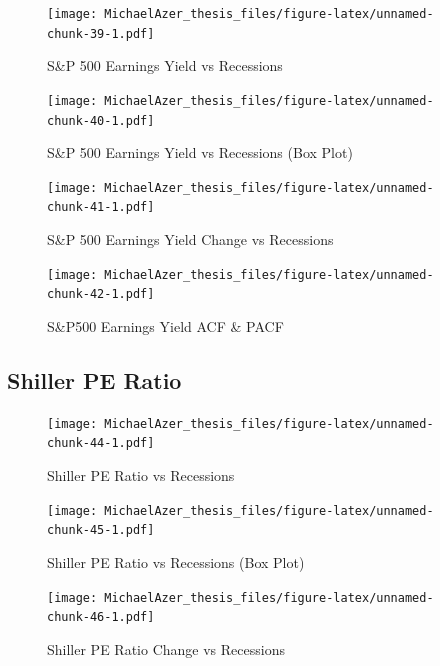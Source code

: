 \documentclass[]{book}
\begin{document}
\begin{figure}
\centering
\texttt{[image: MichaelAzer\_thesis\_files/figure-latex/unnamed-chunk-39-1.pdf]}
\caption{\label{fig:unnamed-chunk-39}\label{fig:figs}S\&P 500 Earnings Yield vs Recessions}
\end{figure}

\begin{figure}
\centering
\texttt{[image: MichaelAzer\_thesis\_files/figure-latex/unnamed-chunk-40-1.pdf]}
\caption{\label{fig:unnamed-chunk-40}\label{fig:figs}S\&P 500 Earnings Yield vs Recessions (Box Plot)}
\end{figure}

\begin{figure}
\centering
\texttt{[image: MichaelAzer\_thesis\_files/figure-latex/unnamed-chunk-41-1.pdf]}
\caption{\label{fig:unnamed-chunk-41}\label{fig:figs}S\&P 500 Earnings Yield Change vs Recessions}
\end{figure}

\begin{figure}
\centering
\texttt{[image: MichaelAzer\_thesis\_files/figure-latex/unnamed-chunk-42-1.pdf]}
\caption{\label{fig:unnamed-chunk-42}\label{fig:figs}S\&P500 Earnings Yield ACF \& PACF}
\end{figure}

\hypertarget{shiller-pe-ratio}{%
\subsection{Shiller PE Ratio}\label{shiller-pe-ratio}}

\begin{figure}
\centering
\texttt{[image: MichaelAzer\_thesis\_files/figure-latex/unnamed-chunk-44-1.pdf]}
\caption{\label{fig:unnamed-chunk-44}\label{fig:figs}Shiller PE Ratio vs Recessions}
\end{figure}

\begin{figure}
\centering
\texttt{[image: MichaelAzer\_thesis\_files/figure-latex/unnamed-chunk-45-1.pdf]}
\caption{\label{fig:unnamed-chunk-45}\label{fig:figs}Shiller PE Ratio vs Recessions (Box Plot)}
\end{figure}

\begin{figure}
\centering
\texttt{[image: MichaelAzer\_thesis\_files/figure-latex/unnamed-chunk-46-1.pdf]}
\caption{\label{fig:unnamed-chunk-46}\label{fig:figs}Shiller PE Ratio Change vs Recessions}
\end{figure}
\end{document}
